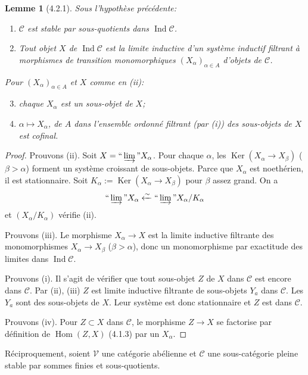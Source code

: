 \documentclass[12pt,a4paper]{article}
\theoremstyle{plain}
\newtheorem{lemma}[theorem]{Lemme}
\theoremstyle{definition}
\theoremstyle{remark}
\DeclareMathOperator{\Ker}{Ker}
\DeclareMathOperator{\Hom}{Hom}
\DeclareMathOperator{\Ind}{Ind}
\begin{document}
\begin{lemma}[4.2.1]\label{lem:4.2.1}
Sous l'hypothèse précédente:
\begin{enumerate}[label=(\roman*)]
\item $\mathcal{C}$ est stable par sous-quotients dans $\Ind\mathcal{C}$.
\item Tout objet $X$ de $\Ind\mathcal{C}$ est la limite inductive d'un système inductif filtrant à morphismes de transition monomorphiques $(X_\alpha)_{\alpha 
\in A}$ d'objets de $\mathcal{C}$.
\end{enumerate}
Pour $(X_\alpha)_{\alpha 
\in A}$ et $X$ comme en (ii):
\begin{enumerate}[label=(\roman*)]
\setcounter{enumi}{2}
\item chaque $X_\alpha$ est un sous-objet de $X$;
\item $\alpha 
\mapsto X_\alpha$, de $A$ dans l'ensemble ordonné filtrant (par (i)) des sous-objets de $X$ est cofinal.
\end{enumerate}
\end{lemma}

\begin{proof}
Prouvons (ii). Soit $X = 
\text{``}
\varinjlim
\text{''} X_\alpha$. Pour chaque $\alpha$, les $\Ker(X_\alpha 
\to X_\beta)$ ($\beta > 
\alpha$) forment un système croissant de sous-objets. Parce que $X_\alpha$ est noethérien, il est stationnaire. Soit $K_\alpha := 
\Ker(X_\alpha 
\to X_\beta)$ pour $\beta$ assez grand. On a
\[
\text{``}
\varinjlim
\text{''} X_\alpha 
\xleftarrow{
\sim} 
\text{``}
\varinjlim
\text{''} X_\alpha/K_\alpha
\]
et $(X_\alpha/K_\alpha)$ vérifie (ii).

Prouvons (iii). Le morphisme $X_\alpha 
\to X$ est la limite inductive filtrante des monomorphismes $X_\alpha 
\to X_\beta$ ($\beta > 
\alpha$), donc un monomorphisme par exactitude des limites dans $\Ind\mathcal{C}$.

Prouvons (i). Il s'agit de vérifier que tout sous-objet $Z$ de $X$ dans $\mathcal{C}$ est encore dans $\mathcal{C}$. Par (ii), (iii) $Z$ est limite inductive filtrante de sous-objets $Y_a$ dans $\mathcal{C}$. Les $Y_a$ sont des sous-objets de $X$. Leur système est donc stationnaire et $Z$ est dans $\mathcal{C}$.

Prouvons (iv). Pour $Z 
\subset X$ dans $\mathcal{C}$, le morphisme $Z 
\to X$ se factorise par définition de $\Hom(Z,X)$ (4.1.3) par un $X_\alpha$.
\end{proof}

Réciproquement, soient $\mathcal{V}$ une catégorie abélienne et $\mathcal{C}$ une sous-catégorie pleine stable par sommes finies et sous-quotients.
\end{document}

